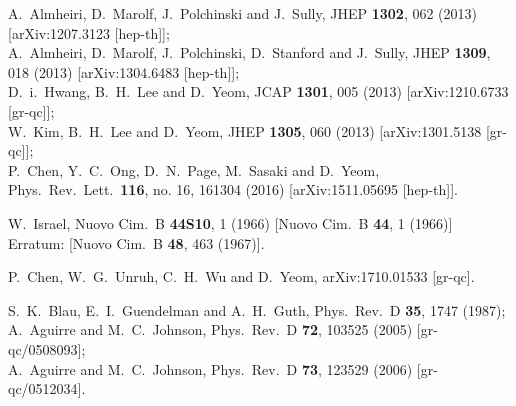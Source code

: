 \documentclass[preprintnumbers,10pt,nofootinbib]{revtex4}
\begin{document}
\begin{thebibliography}{200}
  A.~Almheiri, D.~Marolf, J.~Polchinski and J.~Sully,
  JHEP {\bf 1302}, 062 (2013)
  [arXiv:1207.3123 [hep-th]];\\
  A.~Almheiri, D.~Marolf, J.~Polchinski, D.~Stanford and J.~Sully,
  JHEP {\bf 1309}, 018 (2013)
  [arXiv:1304.6483 [hep-th]];\\
  D.~i.~Hwang, B.~H.~Lee and D.~Yeom,
  JCAP {\bf 1301}, 005 (2013)
  [arXiv:1210.6733 [gr-qc]];\\
  W.~Kim, B.~H.~Lee and D.~Yeom,
  JHEP {\bf 1305}, 060 (2013)
  [arXiv:1301.5138 [gr-qc]];\\
  P.~Chen, Y.~C.~Ong, D.~N.~Page, M.~Sasaki and D.~Yeom,
  Phys.\ Rev.\ Lett.\  {\bf 116}, no. 16, 161304 (2016)
  [arXiv:1511.05695 [hep-th]].

  W.~Israel,
  Nuovo Cim.\ B {\bf 44S10}, 1 (1966)
  [Nuovo Cim.\ B {\bf 44}, 1 (1966)]
  Erratum: [Nuovo Cim.\ B {\bf 48}, 463 (1967)].

  P.~Chen, W.~G.~Unruh, C.~H.~Wu and D.~Yeom,
  arXiv:1710.01533 [gr-qc].

  S.~K.~Blau, E.~I.~Guendelman and A.~H.~Guth,
  Phys.\ Rev.\ D {\bf 35}, 1747 (1987);\\
  A.~Aguirre and M.~C.~Johnson,
  Phys.\ Rev.\ D {\bf 72}, 103525 (2005)
  [gr-qc/0508093];\\
  A.~Aguirre and M.~C.~Johnson,
  Phys.\ Rev.\ D {\bf 73}, 123529 (2006)
  [gr-qc/0512034].


\end{thebibliography}
\end{document}
